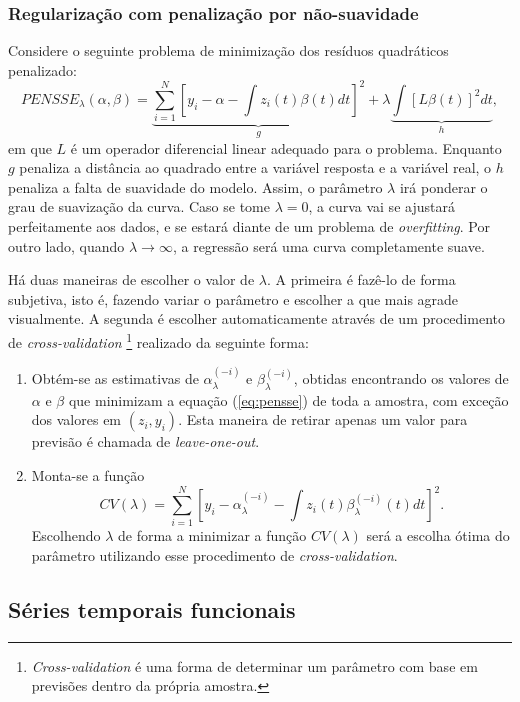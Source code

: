 \documentclass[
	12pt,				%
	openright,			%
	oneside,			%
	a4paper,			%
	english,			%
	brazil				%
	]{dissertacao-ufrgs-abntex2}
\begin{document}
\subsubsection*{Regularização com penalização por não-suavidade}

Considere o seguinte problema de minimização dos resíduos quadráticos
penalizado:
\begin{equation}
PENSSE_{\lambda}(\alpha,\beta)=\underbrace{\sum_{i=1}^{N}[y_{i}-\alpha-\int z_{i}(t)\beta(t)dt]^{2}}_{g}+\lambda\underbrace{\int[L\beta(t)]^{2}dt}_{h},\label{eq:pensse}
\end{equation}
em que $L$ é um operador diferencial linear adequado para o problema.
Enquanto $g$ penaliza a distância ao quadrado entre a variável resposta
e a variável real, o $h$ penaliza a falta de suavidade do modelo.
Assim, o parâmetro $\lambda$ irá ponderar o grau de suavização da
curva. Caso se tome $\lambda=0$, a curva vai se ajustará perfeitamente
aos dados, e se estará diante de um problema de \emph{overfitting}. Por outro lado,
quando $\lambda\rightarrow\infty$, a regressão será uma curva completamente
suave.

Há duas maneiras de escolher o valor de $\lambda$. A primeira é fazê-lo
de forma subjetiva, isto é, fazendo variar o parâmetro e escolher
a que mais agrade visualmente. A segunda é escolher automaticamente
através de um procedimento de \emph{cross-validation} \footnote{\emph{Cross-validation} é uma forma de determinar um parâmetro com base em previsões dentro da própria amostra.} 
realizado da seguinte forma:
\begin{enumerate}
\item Obtém-se as estimativas de $\alpha_{\lambda}^{(-i)}$ e $\beta_{\lambda}^{(-i)}$,
obtidas encontrando os valores de $\alpha$ e $\beta$ que minimizam
a equação (\ref{eq:pensse}) de toda a amostra, com exceção dos valores
em $(z_{i},y_{i})$. Esta maneira de retirar apenas um valor para previsão é chamada de \emph{leave-one-out}.
\item Monta-se a função 
\[
CV(\lambda)=\sum_{i=1}^{N}[y_{i}-\alpha_{\lambda}^{(-i)}-\int z_{i}(t)\beta_{\lambda}^{(-i)}(t)dt]^{2}.
\]
Escolhendo $\lambda$ de forma a minimizar a função $CV(\lambda)$
será a escolha ótima do parâmetro utilizando esse procedimento de
\emph{cross-validation}.
\end{enumerate}

\subsection{Séries temporais funcionais}
\end{document}
